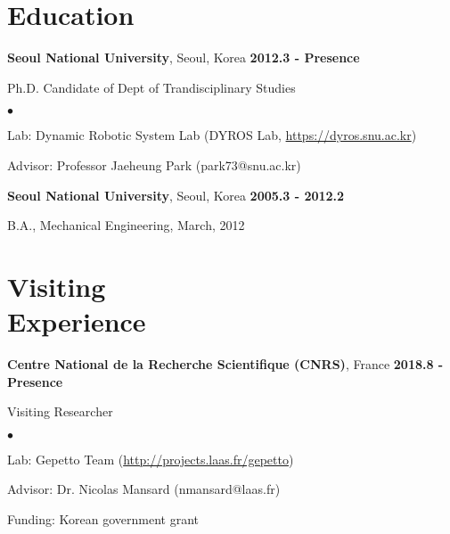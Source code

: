 \documentclass[margin,line]{res}
\newenvironment{list1}{
  \begin{list}{\ding{113}}{%
      \setlength{\itemsep}{0in}
      \setlength{\parsep}{0in} \setlength{\parskip}{0in}
      \setlength{\topsep}{0in} \setlength{\partopsep}{0in} 
      \setlength{\leftmargin}{0.17in}}}{\end{list}}
\newenvironment{list2}{
  \begin{list}{$\bullet$}{%
      \setlength{\itemsep}{0in}
      \setlength{\parsep}{0in} \setlength{\parskip}{0in}
      \setlength{\topsep}{0in} \setlength{\partopsep}{0in} 
      \setlength{\leftmargin}{0.2in}}}{\end{list}}
\begin{document}
\begin{resume}
\section{\sc Education}

{\bf Seoul National University}, Seoul, Korea  \hfill {\bf 2012.3 - Presence} \\
\vspace*{-.1in}
\begin{list1}
\vspace*{-.05in}
\item[] Ph.D. Candidate of Dept of Trandisciplinary Studies 
\begin{list2}
\item Lab: Dynamic Robotic System Lab (DYROS Lab, \url{https://dyros.snu.ac.kr})
\item Advisor: Professor Jaeheung Park (park73@snu.ac.kr)
\end{list2}
\end{list1}

{\bf Seoul National University}, Seoul, Korea  \hfill {\bf 2005.3 - 2012.2} \\
\vspace*{-.1in}
\begin{list1}
\vspace*{-.05in}
\item[] B.A., Mechanical Engineering,  March, 2012
\end{list1}

\section{\sc Visiting \\ Experience}
{\bf Centre National de la Recherche Scientifique (CNRS)}, France  \hfill {\bf 2018.8 - Presence} \\
\vspace*{-.1in}
\begin{list1}
\vspace*{-.05in}
\item[] Visiting Researcher
\begin{list2}
\item Lab: Gepetto Team (\url{http://projects.laas.fr/gepetto})
\item Advisor: Dr. Nicolas Mansard (nmansard@laas.fr)
\item Funding: Korean government grant
\end{list2}
\end{list1}


\end{resume}
\end{document}
